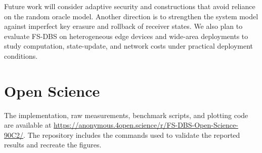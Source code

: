 \documentclass[sigconf,anonymous]{acmart}
\theoremstyle{definition}
\theoremstyle{definition}
\theoremstyle{definition}
\theoremstyle{definition}
\theoremstyle{definition}
\theoremstyle{definition}
\theoremstyle{definition}
\theoremstyle{definition}
\theoremstyle{definition}
\begin{document}
Future work will consider adaptive security and constructions that avoid reliance on the random oracle model. Another direction is to strengthen the system model against imperfect key erasure and rollback of receiver states. We also plan to evaluate FS-DBS on heterogeneous edge devices and wide-area deployments to study computation, state-update, and network costs under practical deployment conditions.


\appendix
\section{Open Science}
The implementation, raw measurements, benchmark scripts, and plotting code are
available at \url{https://anonymous.4open.science/r/FS-DBS-Open-Science-90C2/}.
The repository includes the commands used to validate the reported results and
recreate the figures.
\end{document}
